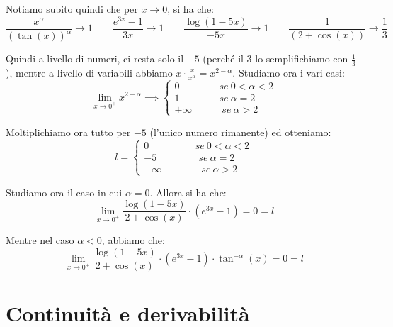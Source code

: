 \documentclass{article}
\begin{document}
\noindent Notiamo subito quindi che per $x \to 0$, si ha che:
\begin{equation*}
    \frac{x^\alpha}{(\tan(x))^\alpha} \to 1 \qquad \frac{e^{3x} - 1}{3x} \to 1 \qquad \frac{\log(1 - 5x)}{-5x} \to 1 \qquad \frac{1}{(2 + \cos(x))} \to \frac{1}{3}
\end{equation*}

\noindent Quindi a livello di numeri, ci resta solo il $-5$ (perché il $3$ lo semplifichiamo con $\frac{1}{3}$), mentre a livello di variabili abbiamo $x \cdot \frac{x}{x^\alpha} = x^{2 - \alpha}$. Studiamo ora i vari casi:
\begin{equation*}
    \lim_{x \to 0^+} x^{2 - \alpha} \implies
    \begin{cases}
        0 \qquad \qquad se \ 0 < \alpha < 2 \\
        1 \qquad \qquad se \ \alpha = 2 \\
        +\infty \qquad \quad se \ \alpha > 2
    \end{cases}
\end{equation*}

\noindent Moltiplichiamo ora tutto per $-5$ (l'unico numero rimanente) ed otteniamo:
\begin{equation*}
    l =
    \begin{cases}
        0 \qquad \qquad \ \ \ se \ 0 < \alpha < 2 \\
        -5 \qquad \qquad \ se \ \alpha = 2 \\
        -\infty \qquad \qquad se \ \alpha > 2
    \end{cases}
\end{equation*}

\noindent Studiamo ora il caso in cui $\alpha = 0$. Allora si ha che:
\begin{equation*}
    \lim_{x \to 0^+} \frac{\log(1 - 5x)}{2 + \cos(x)} \cdot (e^{3x} - 1) = 0 = l
\end{equation*}

\noindent Mentre nel caso $\alpha < 0$, abbiamo che: 
\begin{equation*}
    \lim_{x \to 0^+} \frac{\log(1 - 5x)}{2 + \cos(x)} \cdot (e^{3x} - 1) \cdot \tan^{-\alpha}(x) = 0 = l
\end{equation*}

\newpage

\part{Continuità e derivabilità}
\end{document}
